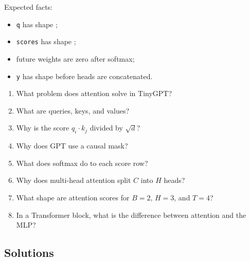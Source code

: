 Expected facts:

\begin{itemize}
  \item \texttt{q} has shape \shape{[1,3,5,4]};
  \item \texttt{scores} has shape \shape{[1,3,5,5]};
  \item future weights are zero after softmax;
  \item \texttt{y} has shape \shape{[1,3,5,4]} before heads are concatenated.
\end{itemize}

\checkpoint

\begin{enumerate}
  \item What problem does attention solve in TinyGPT?
  \item What are queries, keys, and values?
  \item Why is the score \(q_i\cdot k_j\) divided by \(\sqrt d\)?
  \item Why does GPT use a causal mask?
  \item What does softmax do to each score row?
  \item Why does multi-head attention split \(C\) into \(H\) heads?
  \item What shape are attention scores for \(B=2\), \(H=3\), and \(T=4\)?
  \item In a Transformer block, what is the difference between attention and the MLP?
\end{enumerate}

\subsection*{Solutions}

